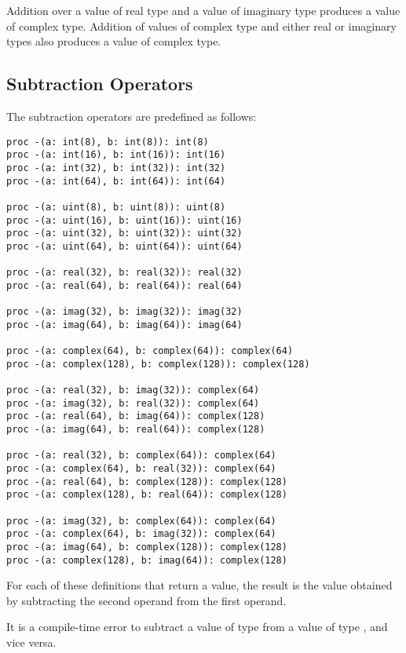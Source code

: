 Addition over a value of real type and a value of imaginary type
produces a value of complex type.  Addition of values of complex type
and either real or imaginary types also produces a value of complex
type.

\pagebreak
\subsection{Subtraction Operators}
\label{Subtraction_Operators}

The subtraction operators are predefined as follows:
\begin{chapel}
\begin{verbatim}
proc -(a: int(8), b: int(8)): int(8)
proc -(a: int(16), b: int(16)): int(16)
proc -(a: int(32), b: int(32)): int(32)
proc -(a: int(64), b: int(64)): int(64)

proc -(a: uint(8), b: uint(8)): uint(8)
proc -(a: uint(16), b: uint(16)): uint(16)
proc -(a: uint(32), b: uint(32)): uint(32)
proc -(a: uint(64), b: uint(64)): uint(64)

proc -(a: real(32), b: real(32)): real(32)
proc -(a: real(64), b: real(64)): real(64)

proc -(a: imag(32), b: imag(32)): imag(32)
proc -(a: imag(64), b: imag(64)): imag(64)

proc -(a: complex(64), b: complex(64)): complex(64)
proc -(a: complex(128), b: complex(128)): complex(128)

proc -(a: real(32), b: imag(32)): complex(64)
proc -(a: imag(32), b: real(32)): complex(64)
proc -(a: real(64), b: imag(64)): complex(128)
proc -(a: imag(64), b: real(64)): complex(128)

proc -(a: real(32), b: complex(64)): complex(64)
proc -(a: complex(64), b: real(32)): complex(64)
proc -(a: real(64), b: complex(128)): complex(128)
proc -(a: complex(128), b: real(64)): complex(128)

proc -(a: imag(32), b: complex(64)): complex(64)
proc -(a: complex(64), b: imag(32)): complex(64)
proc -(a: imag(64), b: complex(128)): complex(128)
proc -(a: complex(128), b: imag(64)): complex(128)
\end{verbatim}
\end{chapel}
For each of these definitions that return a value, the result is the
value obtained by subtracting the second operand from the first
operand.

It is a compile-time error to subtract a value of type 
from a value of type , and vice versa.

